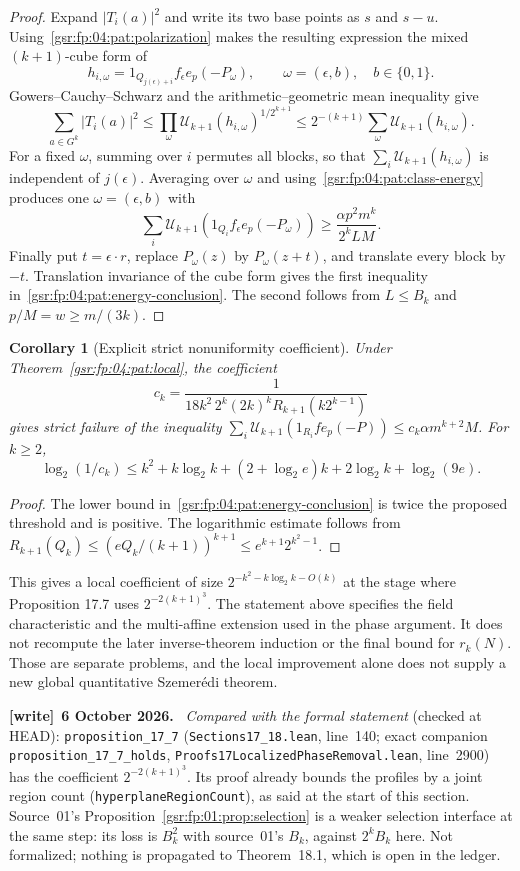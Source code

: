 \documentclass[11pt,letterpaper]{article}
\numberwithin{equation}{section}
\newtheorem{corollary}[theorem]{Corollary}
\theoremstyle{definition}
\theoremstyle{remark}
\newcommand{\1}{\mathbf 1}
\newcommand{\file}[1]{\nolinkurl{#1}}
\newenvironment{writenote}[1][]{\par\smallskip\begingroup\small
 \noindent\textbf{[write]}\if\relax\detokenize{#1}\relax\else~\textbf{#1.}\fi\ }%
 {\par\endgroup\smallskip}
\begin{document}
\begin{proof}
Expand $|T_i(a)|^2$ and write its two base points as $s$ and $s-u$.
Using~\eqref{gsr:fp:04:pat:polarization} makes the resulting expression the mixed
$(k+1)$-cube form of
\[
 h_{i,\omega}
   =1_{Q_{j(\epsilon)+i}}f_\epsilon e_p(-P_\omega),
 \qquad \omega=(\epsilon,b),\quad b\in\{0,1\}.
\]
Gowers--Cauchy--Schwarz and the arithmetic--geometric mean inequality give
\[
 \sum_{a\in G^k}|T_i(a)|^2
 \le\prod_{\omega}\mathcal U_{k+1}(h_{i,\omega})^{1/2^{k+1}}
 \le2^{-(k+1)}\sum_{\omega}\mathcal U_{k+1}(h_{i,\omega}).
\]
For a fixed $\omega$, summing over $i$ permutes all blocks, so that
$\sum_i\mathcal U_{k+1}(h_{i,\omega})$ is independent of
$j(\epsilon)$. Averaging over $\omega$ and
using~\eqref{gsr:fp:04:pat:class-energy} produces one $\omega=(\epsilon,b)$ with
\[
 \sum_i\mathcal U_{k+1}
    (1_{Q_i}f_\epsilon e_p(-P_\omega))
 \ge\frac{\alpha p^2m^k}{2^kLM}.
\]
Finally put $t=\epsilon\cdot r$, replace $P_\omega(z)$ by
$P_\omega(z+t)$, and translate every block by $-t$.
Translation invariance of the cube form gives the first inequality
in~\eqref{gsr:fp:04:pat:energy-conclusion}. The second follows from
$L\le B_k$ and $p/M=w\ge m/(3k)$.
\end{proof}

\begin{corollary}[Explicit strict nonuniformity coefficient]
\label{gsr:fp:04:pat:coefficient}
Under Theorem~\ref{gsr:fp:04:pat:local}, the coefficient
\[
 c_k=\frac1{18k^2\,2^k(2k)^kR_{k+1}(k2^{k-1})}
\]
gives strict failure of the inequality
$\sum_i\mathcal U_{k+1}(1_{R_i}fe_p(-P))
\le c_k\alpha m^{k+2}M$.
For $k\ge2$,
\[
 \log_2(1/c_k)
 \le k^2+k\log_2k+(2+\log_2e)k
       +2\log_2k+\log_2(9e).
\]
\end{corollary}
\begin{proof}
The lower bound in~\eqref{gsr:fp:04:pat:energy-conclusion} is twice the proposed
threshold and is positive. The logarithmic estimate follows from
$R_{k+1}(Q_k)\le(eQ_k/(k+1))^{k+1}
\le e^{k+1}2^{k^2-1}$.
\end{proof}

This gives a local coefficient of size
$2^{-k^2-k\log_2k-O(k)}$ at the stage where Proposition 17.7 uses
$2^{-2(k+1)^3}$. The statement above specifies the field characteristic
and the multi-affine extension used in the phase argument. It does not
recompute the later inverse-theorem induction or the final bound for
$r_k(N)$. Those are separate problems, and the local improvement alone
does not supply a new global quantitative Szemer\'edi theorem.
\begin{writenote}[6 October 2026]
\emph{Compared with the formal statement} (checked at HEAD): \file{proposition_17_7} (\file{Sections17\_18.lean}, line~140; exact companion \file{proposition_17_7_holds}, \file{Proofs17LocalizedPhaseRemoval.lean}, line~2900) has the coefficient $2^{-2(k+1)^3}$. Its proof already bounds the profiles by a joint region count (\texttt{hyperplaneRegionCount}), as said at the start of this section. Source~01's Proposition~\ref{gsr:fp:01:prop:selection} is a weaker selection interface at the same step: its loss is $B_k^2$ with source~01's $B_k$, against $2^kB_k$ here. Not formalized; nothing is propagated to Theorem~18.1, which is open in the ledger.
\end{writenote}
\end{document}
